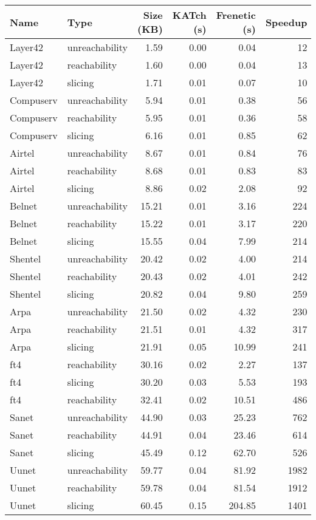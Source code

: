 \begin{tabular}{llrrrr}
\toprule
Name & Type & Size (KB) & KATch (s) & Frenetic (s) & Speedup \\
\midrule
Layer42 & unreachability & 1.59 & 0.00 & 0.04 & 12 \\
Layer42 & reachability & 1.60 & 0.00 & 0.04 & 13 \\
Layer42 & slicing & 1.71 & 0.01 & 0.07 & 10 \\
Compuserv & unreachability & 5.94 & 0.01 & 0.38 & 56 \\
Compuserv & reachability & 5.95 & 0.01 & 0.36 & 58 \\
Compuserv & slicing & 6.16 & 0.01 & 0.85 & 62 \\
Airtel & unreachability & 8.67 & 0.01 & 0.84 & 76 \\
Airtel & reachability & 8.68 & 0.01 & 0.83 & 83 \\
Airtel & slicing & 8.86 & 0.02 & 2.08 & 92 \\
Belnet & unreachability & 15.21 & 0.01 & 3.16 & 224 \\
Belnet & reachability & 15.22 & 0.01 & 3.17 & 220 \\
Belnet & slicing & 15.55 & 0.04 & 7.99 & 214 \\
Shentel & unreachability & 20.42 & 0.02 & 4.00 & 214 \\
Shentel & reachability & 20.43 & 0.02 & 4.01 & 242 \\
Shentel & slicing & 20.82 & 0.04 & 9.80 & 259 \\
Arpa & unreachability & 21.50 & 0.02 & 4.32 & 230 \\
Arpa & reachability & 21.51 & 0.01 & 4.32 & 317 \\
Arpa & slicing & 21.91 & 0.05 & 10.99 & 241 \\
ft4 & reachability & 30.16 & 0.02 & 2.27 & 137 \\
ft4 & slicing & 30.20 & 0.03 & 5.53 & 193 \\
ft4 & reachability & 32.41 & 0.02 & 10.51 & 486 \\
Sanet & unreachability & 44.90 & 0.03 & 25.23 & 762 \\
Sanet & reachability & 44.91 & 0.04 & 23.46 & 614 \\
Sanet & slicing & 45.49 & 0.12 & 62.70 & 526 \\
Uunet & unreachability & 59.77 & 0.04 & 81.92 & 1982 \\
Uunet & reachability & 59.78 & 0.04 & 81.54 & 1912 \\
Uunet & slicing & 60.45 & 0.15 & 204.85 & 1401 \\

\end{tabular}
